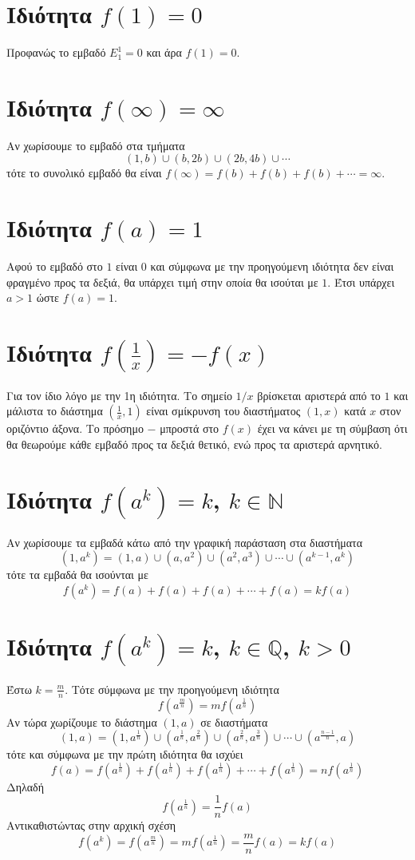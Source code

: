 \documentclass[12pt,titlepage]{article}
\begin{document}
\section{Ιδιότητα $f(1)=0$}
Προφανώς το εμβαδό $E_1^1=0$ και άρα $f(1)=0$.

\section{Ιδιότητα $f(\infty)=\infty$}
Αν χωρίσουμε το εμβαδό στα τμήματα
$$(1,b)\cup (b,2b) \cup (2b,4b) \cup \cdots$$
τότε το συνολικό εμβαδό θα είναι $f(\infty)=f(b)+f(b)+f(b)+\cdots=\infty$.

\section{Ιδιότητα $f(a)=1$}
Αφού το εμβαδό στο $1$ είναι $0$ και σύμφωνα με την προηγούμενη ιδιότητα δεν είναι φραγμένο προς τα δεξιά, θα υπάρχει τιμή στην οποία θα ισούται με $1$. Έτσι υπάρχει $a>1$ ώστε $f(a)=1$.

\section{Ιδιότητα $f(\frac{1}{x})=-f(x)$}
Για τον ίδιο λόγο με την 1η ιδιότητα. Το σημείο $1/x$ βρίσκεται αριστερά από το $1$ και μάλιστα το διάστημα $(\frac{1}{x},1)$ είναι σμίκρυνση του διαστήματος $(1,x)$ κατά $x$ στον οριζόντιο άξονα. Το πρόσημο $-$ μπροστά στο $f(x)$ έχει να κάνει με τη σύμβαση ότι θα θεωρούμε κάθε εμβαδό προς τα δεξιά θετικό, ενώ προς τα αριστερά αρνητικό.

\section{Ιδιότητα $f(a^k)=k$, $k \in \mathbb{N}$}
Αν χωρίσουμε τα εμβαδά κάτω από την γραφική παράσταση στα διαστήματα
$$(1,a^k)=(1,a)\cup (a,a^2) \cup (a^2,a^3) \cup \cdots \cup (a^{k-1},a^k)$$
τότε τα εμβαδά θα ισούνται με
$$f(a^k)=f(a)+f(a)+f(a)+\cdots+f(a)=kf(a)$$

\section{Ιδιότητα $f(a^k)=k$, $k \in \mathbb{Q}$, $k>0$}
Έστω $k=\frac{m}{n}$. Τότε σύμφωνα με την προηγούμενη ιδιότητα
$$f(a^{\frac{m}{n}})=mf(a^\frac{1}{n})$$
Αν τώρα χωρίζουμε το διάστημα $(1,a)$ σε διαστήματα
$$(1,a)=(1,a^{\frac{1}{n}})\cup (a^{\frac{1}{n}},a^{\frac{2}{n}})\cup (a^{\frac{2}{n}},a^{\frac{3}{n}})\cup \cdots \cup (a^{\frac{n-1}{n}},a)$$
τότε και σύμφωνα με την πρώτη ιδιότητα θα ισχύει
$$f(a)=f(a^{\frac{1}{n}})+f(a^{\frac{1}{n}})+f(a^{\frac{1}{n}})+\cdots+f(a^{\frac{1}{n}})=nf(a^{\frac{1}{n}})$$
Δηλαδή
$$f(a^{\frac{1}{n}})=\frac{1}{n}f(a)$$
Αντικαθιστώντας στην αρχική σχέση
$$f(a^k)=f(a^{\frac{m}{n}})=mf(a^\frac{1}{n})=\frac{m}{n}f(a)=kf(a)$$
\end{document}
